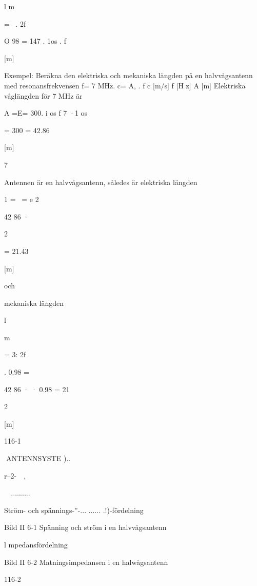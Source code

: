 \documentclass[a4paper,twoside,twocolumn,openright]{book}
\begin{document}
{{{{l
m

=~ .
2f

O 98 = 147 . 1os
.
f

[m]

Exempel: Beräkna den elektriska och mekaniska längden på en halvvågsantenn med
resonansfrekvensen f= 7 MHz.
c= A, . f
c [m/s] f [H z] A [m]
Elektriska våglängden för 7 MHz är

A =E= 300. i os
f
7 ·1 os

= 300 = 42.86

[m]

7

Antennen är en halvvågsantenn, således är
elektriska längden

1 =~ =
e
2

42 86
·

2

= 21.43

[m]

och

mekaniska längden

l

m

= 3:
2f

. 0.98 =

42 86
· · 0.98 = 21

2

[m]

116-1

ANTENNSYSTE
)..

r--2-~~,

~
..........

Ström- och spännings-''-... ...... .!)-fördelning

Bild II 6-1 Spänning och ström i en
halvvågsantenn

l mpedansfördelning

Bild II 6-2 Matningsimpedansen
i en halwågsantenn

116-2

}}}}
\end{document}

